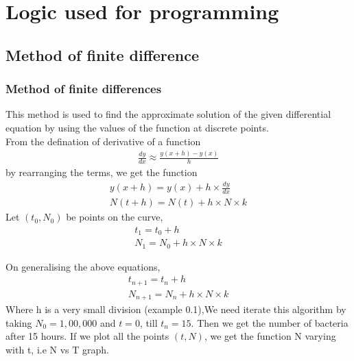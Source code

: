 \documentclass{beamer}
\providecommand{\brak}[1]{\ensuremath{\left(#1\right)}}
\theoremstyle{remark}
\numberwithin{equation}{section}
\begin{document}
\section{Logic used for programming}
\subsection{Method of finite difference}
\begin{frame}[fragile]
\frametitle{Method of finite differences}
This method is used to find the approximate solution of the given differential equation by using the values of the function at discrete points.  \\
From the defination of derivative of a function 
\begin{align}
\frac{dy}{dx} \approx \frac{y\brak{x+h}-y\brak{x}}{h} \label{11}
\end{align}
by rearranging the terms, we get the function
\begin{align}
y\brak{x+h}=y\brak{x}+h \times \frac{dy}{dx} \\
N\brak{t+h}=N\brak{t}+h \times N \times k
\end{align}
Let \brak{t_0,N_0} be points on the curve,
\begin{align}
t_1=t_0+h \\
N_1=N_0+h \times N \times k
\end{align}
\end{frame}
\begin{frame}[fragile]
    On  generalising the above equations,
\begin{align}
t_{n+1}=t_{n}+h \\
N_{n+1}=N_{n}+h \times N \times k \label{21}
\end{align}
Where h is a very small division (example 0.1),We need iterate this algorithm by taking $N_0=1,00,000$ and $t=0$, till $t_n=15$. Then we get the number of bacteria  after 15 hours.
If we plot all the points $(t,N)$, we get the function N varying with t, i.e N vs T graph. \\
\end{frame}
\end{document}
